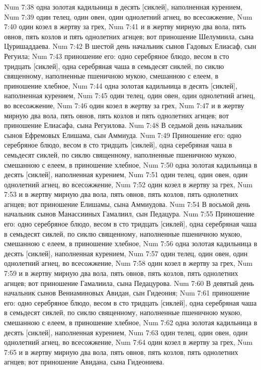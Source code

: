 Num 7:38  одна золотая кадильница в десять [сиклей], наполненная курением,
Num 7:39  один телец, один овен, один однолетний агнец, во всесожжение,
Num 7:40  один козел в жертву за грех,
Num 7:41  и в жертву мирную два вола, пять овнов, пять козлов и пять однолетних агнцев; вот приношение Шелумиила, сына Цуришаддаева.
Num 7:42  В шестой день начальник сынов Гадовых Елиасаф, сын Регуила;
Num 7:43  приношение его: одно серебряное блюдо, весом в сто тридцать [сиклей], одна серебряная чаша в семьдесят сиклей, по сиклю священному, наполненные пшеничною мукою, смешанною с елеем, в приношение хлебное,
Num 7:44  одна золотая кадильница в десять [сиклей], наполненная курением,
Num 7:45  один телец, один овен, один однолетний агнец, во всесожжение,
Num 7:46  один козел в жертву за грех,
Num 7:47  и в жертву мирную два вола, пять овнов, пять козлов и пять однолетних агнцев; вот приношение Елиасафа, сына Регуилова.
Num 7:48  В седьмой день начальник сынов Ефремовых Елишама, сын Аммиуда.
Num 7:49  Приношение его: одно серебряное блюдо, весом в сто тридцать [сиклей], одна серебряная чаша в семьдесят сиклей, по сиклю священному, наполненные пшеничною мукою, смешанною с елеем, в приношение хлебное,
Num 7:50  одна золотая кадильница в десять [сиклей], наполненная курением,
Num 7:51  один телец, один овен, один однолетний агнец, во всесожжение,
Num 7:52  один козел в жертву за грех,
Num 7:53  и в жертву мирную два вола, пять овнов, пять козлов, пять однолетних агнцев; вот приношение Елишамы, сына Аммиудова.
Num 7:54  В восьмой день начальник сынов Манассииных Гамалиил, сын Педацура.
Num 7:55  Приношение его: одно серебряное блюдо, весом в сто тридцать [сиклей], одна серебряная чаша в семьдесят сиклей, по сиклю священному, наполненные пшеничною мукою, смешанною с елеем, в приношение хлебное,
Num 7:56  одна золотая кадильница в десять [сиклей], наполненная курением,
Num 7:57  один телец, один овен, один однолетний агнец, во всесожжение,
Num 7:58  один козел в жертву за грех,
Num 7:59  и в жертву мирную два вола, пять овнов, пять козлов, пять однолетних агнцев; вот приношение Гамалиила, сына Педацурова.
Num 7:60  В девятый день начальник сынов Вениаминовых Авидан, сын Гидеония;
Num 7:61  приношение его: одно серебряное блюдо, весом в сто тридцать [сиклей], одна серебряная чаша в семьдесят сиклей, по сиклю священному, наполненные пшеничною мукою, смешанною с елеем, в приношение хлебное,
Num 7:62  одна золотая кадильница в десять [сиклей], наполненная курением,
Num 7:63  один телец, один овен, один однолетний агнец, во всесожжение,
Num 7:64  один козел в жертву за грех,
Num 7:65  и в жертву мирную два вола, пять овнов, пять козлов, пять однолетних агнцев; вот приношение Авидана, сына Гидеониева.

